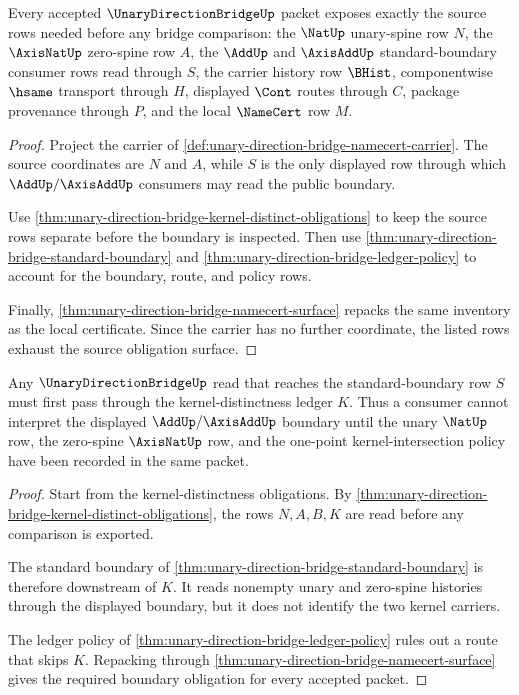 \begin{theorem}
\label{thm:unary-direction-bridge-source-obligation-inventory}
Every accepted $\UnaryDirectionBridgeUp$ packet exposes exactly the source rows needed before any bridge comparison: the $\NatUp$ unary-spine row $N$, the $\AxisNatUp$ zero-spine row $A$, the $\AddUp$ and $\AxisAddUp$ standard-boundary consumer rows read through $S$, the carrier history row $\BHist$, componentwise $\hsame$ transport through $H$, displayed $\Cont$ routes through $C$, package provenance through $P$, and the local $\NameCert$ row $M$.
\end{theorem}
\begin{proof}
Project the carrier of \autoref{def:unary-direction-bridge-namecert-carrier}. The source coordinates are $N$ and $A$, while $S$ is the only displayed row through which $\AddUp/\AxisAddUp$ consumers may read the public boundary.

Use \autoref{thm:unary-direction-bridge-kernel-distinct-obligations} to keep the source rows separate before the boundary is inspected. Then use \autoref{thm:unary-direction-bridge-standard-boundary} and \autoref{thm:unary-direction-bridge-ledger-policy} to account for the boundary, route, and policy rows.

Finally, \autoref{thm:unary-direction-bridge-namecert-surface} repacks the same inventory as the local certificate. Since the carrier has no further coordinate, the listed rows exhaust the source obligation surface.
\end{proof}

\begin{theorem}
\label{thm:unary-direction-bridge-kernel-boundary-obligation}
Any $\UnaryDirectionBridgeUp$ read that reaches the standard-boundary row $S$ must first pass through the kernel-distinctness ledger $K$. Thus a consumer cannot interpret the displayed $\AddUp/\AxisAddUp$ boundary until the unary $\NatUp$ row, the zero-spine $\AxisNatUp$ row, and the one-point kernel-intersection policy have been recorded in the same packet.
\end{theorem}
\begin{proof}
Start from the kernel-distinctness obligations. By \autoref{thm:unary-direction-bridge-kernel-distinct-obligations}, the rows $N,A,B,K$ are read before any comparison is exported.

The standard boundary of \autoref{thm:unary-direction-bridge-standard-boundary} is therefore downstream of $K$. It reads nonempty unary and zero-spine histories through the displayed boundary, but it does not identify the two kernel carriers.

The ledger policy of \autoref{thm:unary-direction-bridge-ledger-policy} rules out a route that skips $K$. Repacking through \autoref{thm:unary-direction-bridge-namecert-surface} gives the required boundary obligation for every accepted packet.
\end{proof}

